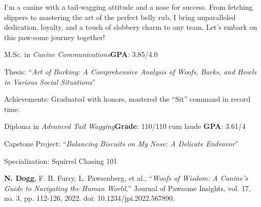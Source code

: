 \documentclass{article}
\begin{document}
\small
\smallskip
\vspace*{-44pt}


\begin{justify}    
    I'm a canine with a tail-wagging attitude and a nose for success. From fetching slippers to mastering the art of the perfect belly rub, I bring unparalleled dedication, loyalty, and a touch of slobbery charm to any team. Let's embark on this paw-some journey together!
\end{justify}

    {M.Sc. in \textit{Canine Communications}}{\textbf{GPA}: 3.85/4.0}
    {
        \begin{bullet-list-minor}
            \item Thesis: ``\textit{Art of Barking: A Comprehensive Analysis of Woofs, Barks, and Howls in Various Social Situations}''
            \item Achievements: Graduated with honors, mastered the ``Sit'' command in record time.
        \end{bullet-list-minor}
    }

    {Diploma in \textit{Advanced Tail Wagging}}{\textbf{Grade}: 110/110 cum laude  \textbf{GPA}: 3.61/4}
    {
        \begin{bullet-list-minor}
            \item Capstone Project: ``\textit{Balancing Biscuits on My Nose: A Delicate Endeavor}''
            \item Specialization: Squirrel Chasing 101
        \end{bullet-list-minor}
    }

    \begin{bullet-list-major}
        \item \textbf{N. Dogg}, F. B. Furry, L. Pawsenberg, et al., ``\textit{Woofs of Wisdom: A Canine's Guide to Navigating the Human World},'' Journal of Pawsome Insights, vol. 17, no. 3, pp. 112-126, 2022. doi: 10.1234/jpi.2022.567890.
    \end{bullet-list-major}
\end{document}
